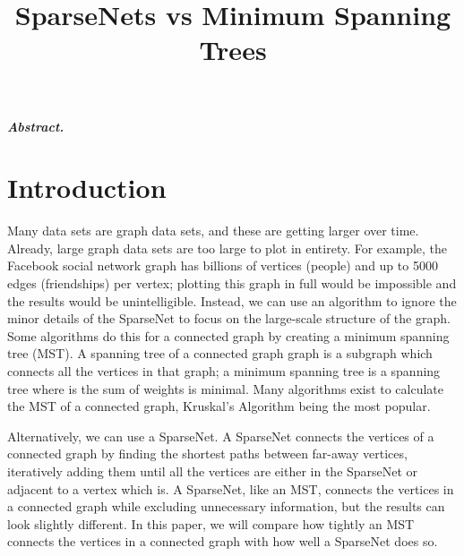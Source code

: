 \documentclass[conference]{IEEEtran}
\begin{document}
\title{SparseNets vs Minimum Spanning Trees}

\author{
}

\maketitle

\textbf{\textit{Abstract.}}

\section{Introduction}

Many data sets are graph data sets, and these are getting larger over time.
Already, large graph data sets are too large to plot in entirety.
For example, the Facebook social network graph has billions of vertices (people) and up to 5000 edges (friendships) per vertex; plotting this graph in full would be impossible and the results would be unintelligible.
Instead, we can use an algorithm to ignore the minor details of the SparseNet to focus on the large-scale structure of the graph.
Some algorithms do this for a connected graph by creating a minimum spanning tree (MST).
A spanning tree of a connected graph graph is a subgraph which connects all the vertices in that graph; a minimum spanning tree is a spanning tree where is the sum of weights is minimal.
Many algorithms exist to calculate the MST of a connected graph, Kruskal's Algorithm being the most popular.

Alternatively, we can use a SparseNet.
A SparseNet connects the vertices of a connected graph by finding the shortest paths between far-away vertices, iteratively adding them until all the vertices are either in the SparseNet or adjacent to a vertex which is.
A SparseNet, like an MST, connects the vertices in a connected graph while excluding unnecessary information, but the results can look slightly different.
In this paper, we will compare how tightly an MST connects the vertices in a connected graph with how well a SparseNet does so.
\end{document}
